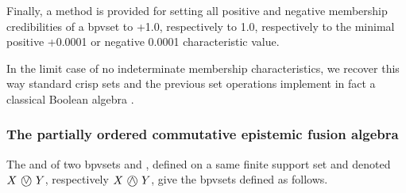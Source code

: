 \documentclass[a4paper,12pt,english]{sphinxhowto}
\begin{document}
\sphinxAtStartPar
Finally, a  method is provided for setting all positive and negative membership credibilities of a bpv\sphinxhyphen{}set to +1.0, respectively to \sphinxhyphen{}1.0, respectively to the minimal positive +0.0001 or negative \sphinxhyphen{}0.0001 characteristic value.

%
\begin{sphinxVerbatim}[commandchars=\\\{\},numbers=left,firstnumber=1,stepnumber=1]
  
  
\end{sphinxVerbatim}
\sphinxresetverbatimhllines

\sphinxAtStartPar
In the limit case of no indeterminate membership characteristics, we recover this way standard crisp sets and the previous set operations implement in fact a classical Boolean algebra .


\subsubsection{The partially ordered commutative epistemic fusion algebra}
\label{\detokenize{pearls:the-partially-ordered-commutative-epistemic-fusion-algebra}}
\sphinxAtStartPar
The  and   of two bpv\sphinxhyphen{}sets  and , defined on a same finite support set  and denoted \(X $ \textcircled{$\vee$} $ Y\), respectively \(X $ \textcircled{$\wedge$} $ Y\), give the bpv\sphinxhyphen{}sets defined as follows.
\end{document}
